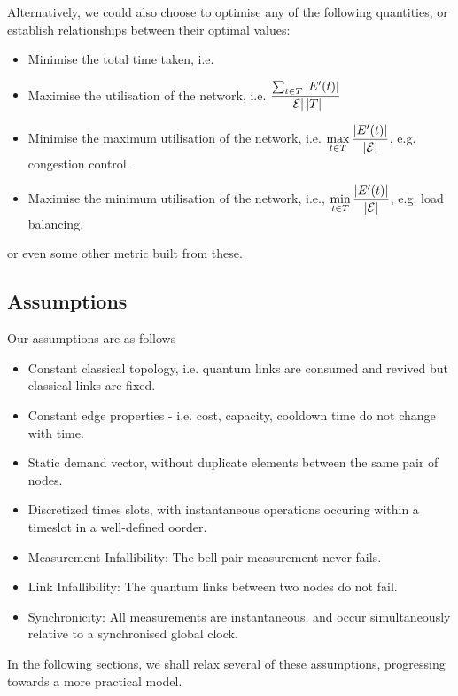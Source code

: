 \documentclass{amsart}
\begin{document}
    Alternatively, we could also choose to optimise any of the following quantities, or establish relationships between their optimal values: \begin{itemize}
        \item Minimise the total time taken, i.e. 
        \item Maximise the utilisation of the network, i.e. \(\displaystyle \frac{\sum_{t \in T} \left|E'(t)\right|}{\left|\mathcal{E}\right| \left|T\right|}\)
        \item Minimise the maximum utilisation of the network, i.e. \(\displaystyle \max_{t \in T} \frac{\left|E'(t)\right|}{\left|\mathcal{E}\right|}\), e.g. congestion control.
        \item Maximise the minimum utilisation of the network, i.e., \(\displaystyle \min_{t \in T} \frac{\left|E'(t)\right|}{\left|\mathcal{E}\right|}\), e.g. load balancing.
    \end{itemize}

    or even some other metric built from these.

    \subsection{Assumptions}

    Our assumptions are as follows
    \begin{itemize}
        \item Constant classical topology, i.e. quantum links are consumed and revived but classical links are fixed.
        \item Constant edge properties - i.e. cost, capacity, cooldown time do not change with time.
        \item Static demand vector, without duplicate elements between the same pair of nodes.
        \item Discretized times slots, with instantaneous operations occuring within a timeslot in a well-defined oorder.
        \item Measurement Infallibility: The bell-pair measurement never fails.
        \item Link Infallibility: The quantum links between two nodes do not fail.
        \item Synchronicity: All measurements are instantaneous, and occur simultaneously relative to a synchronised global clock.
    \end{itemize}

    In the following sections, we shall relax several of these assumptions, progressing towards a more practical model.
\end{document}

